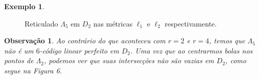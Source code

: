 \documentclass{article}
\theoremstyle{plain}
\newtheorem{observation}{Observa\c{c}\~ao}
\theoremstyle{definition}
\newtheorem{example}{Exemplo}
\theoremstyle{remark}
\begin{document}
\begin{example}
\begin{figure}[ht]
          \caption{Reticulado $\Lambda_5$ em $D_2$ nas métricas $\ell_1$ e $\ell_2$ respectivamente.}
		\end{figure}
  \end{example}

  \begin{observation}
    Ao contrário do que aconteceu com $r=2$ e $r=4$, temos que $\Lambda_5$ não é um $6$-código linear perfeito em $D_2$. Uma vez que ao centrarmos bolas nos pontos de $\Lambda_2$, podemos ver que suas intersecções não são vazias em $D_2$, como segue na Figura 6.
  \end{observation}

  
\end{document}
